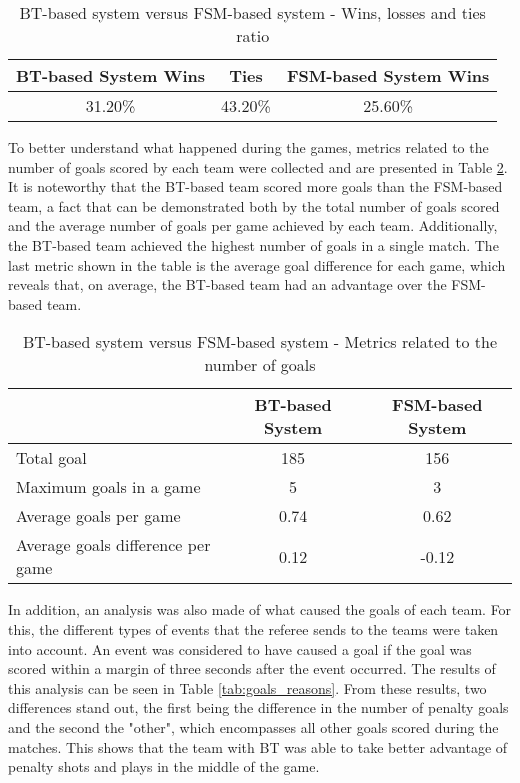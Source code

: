 \begin{table}[h]
    \centering
    \begin{tabular}{c c c}
        \toprule
        BT-based System Wins & Ties    & FSM-based System Wins \\
        \midrule
        31.20\%              & 43.20\% & 25.60\%  \\
        \bottomrule
    \end{tabular}
    \caption{BT-based system versus FSM-based system - Wins, losses and ties ratio}
    \label{tab:wins}
\end{table}

To better understand what happened during the games, metrics related to the number of goals scored by each team were collected and are presented in Table \ref{tab:goals_number_metrics}. It is noteworthy that the BT-based team scored more goals than the FSM-based team, a fact that can be demonstrated both by the total number of goals scored and the average number of goals per game achieved by each team. Additionally, the BT-based team achieved the highest number of goals in a single match. The last metric shown in the table is the average goal difference for each game, which reveals that, on average, the BT-based team had an advantage over the FSM-based team.

\begin{table}[h]
    \centering
    \begin{tabular}{l c c}
        \toprule
                                          & BT-based System & FSM-based System \\
        \midrule
        Total goal                        & 185             & 156              \\
        Maximum goals in a game           & 5               & 3                \\
        Average goals per game            & 0.74            & 0.62             \\
        Average goals difference per game & 0.12            & -0.12            \\
        \bottomrule
    \end{tabular}
    \caption{BT-based system versus FSM-based system - Metrics related to the number of goals}
    \label{tab:goals_number_metrics}
\end{table}

In addition, an analysis was also made of what caused the goals of each team. For this, the different types of events that the referee sends to the teams were taken into account. An event was considered to have caused a goal if the goal was scored within a margin of three seconds after the event occurred. The results of this analysis can be seen in Table \ref{tab:goals_reasons}. From these results, two differences stand out, the first being the difference in the number of penalty goals and the second the "other", which encompasses all other goals scored during the matches. This shows that the team with BT was able to take better advantage of penalty shots and plays in the middle of the game.

